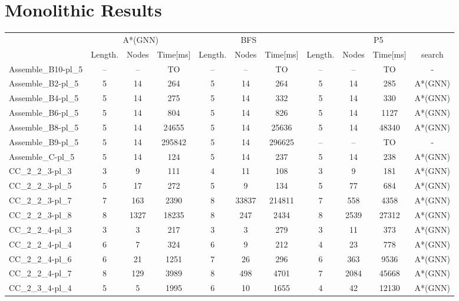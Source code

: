 \documentclass{article}
\newcommand{\BFSres}{BFS}
\newcommand{\GNNres}{A*(GNN)}
\newcommand{\planLength}{Length.}
\newcommand{\nodesExp}{Nodes}
\newcommand{\solvingTime}{Time}
\newcommand{\unsolvedColumn}{--}
\newcommand{\myTO}{TO}
\newcommand{\Pfive}{P5}   %
\begin{document}
\section*{Monolithic Results}
\begin{longtable}[!ht]{l|ccc|ccc|cccc}
\centering
\multirow2{*}{\textbf{Instance Name}} & \multicolumn{3}{c|}{\GNNres} & \multicolumn{3}{c|}{\BFSres} & \multicolumn{4}{c}{\Pfive} \\
\cline{2-11}
& \planLength & \nodesExp & \solvingTime [ms] & \planLength & \nodesExp & \solvingTime [ms] & \planLength & \nodesExp & \solvingTime [ms] & search \\
\hline
Assemble\_B10-pl\_5 & \unsolvedColumn & \unsolvedColumn & \myTO & \unsolvedColumn & \unsolvedColumn & \myTO & \unsolvedColumn & \unsolvedColumn & \myTO & - \\
Assemble\_B2-pl\_5 & 5 & 14 & 264 & 5 & 14 & 264 & 5 & 14 & 285 & A*(GNN) \\
Assemble\_B4-pl\_5 & 5 & 14 & 275 & 5 & 14 & 332 & 5 & 14 & 330 & A*(GNN) \\
Assemble\_B6-pl\_5 & 5 & 14 & 804 & 5 & 14 & 826 & 5 & 14 & 1127 & A*(GNN) \\
Assemble\_B8-pl\_5 & 5 & 14 & 24655 & 5 & 14 & 25636 & 5 & 14 & 48340 & A*(GNN) \\
Assemble\_B9-pl\_5 & 5 & 14 & 295842 & 5 & 14 & 296625 & \unsolvedColumn & \unsolvedColumn & \myTO & - \\
Assemble\_C-pl\_5 & 5 & 14 & 124 & 5 & 14 & 237 & 5 & 14 & 238 & A*(GNN) \\
CC\_2\_2\_3-pl\_3 & 3 & 9 & 111 & 4 & 11 & 108 & 3 & 9 & 181 & A*(GNN) \\
CC\_2\_2\_3-pl\_5 & 5 & 17 & 272 & 5 & 9 & 134 & 5 & 77 & 684 & A*(GNN) \\
CC\_2\_2\_3-pl\_7 & 7 & 163 & 2390 & 8 & 33837 & 214811 & 7 & 558 & 4358 & A*(GNN) \\
CC\_2\_2\_3-pl\_8 & 8 & 1327 & 18235 & 8 & 247 & 2434 & 8 & 2539 & 27312 & A*(GNN) \\
CC\_2\_2\_4-pl\_3 & 3 & 3 & 217 & 3 & 3 & 279 & 3 & 11 & 373 & A*(GNN) \\
CC\_2\_2\_4-pl\_4 & 6 & 7 & 324 & 6 & 9 & 212 & 4 & 23 & 778 & A*(GNN) \\
CC\_2\_2\_4-pl\_6 & 6 & 21 & 1251 & 7 & 26 & 296 & 6 & 363 & 9536 & A*(GNN) \\
CC\_2\_2\_4-pl\_7 & 8 & 129 & 3989 & 8 & 498 & 4701 & 7 & 2084 & 45668 & A*(GNN) \\
CC\_2\_3\_4-pl\_4 & 5 & 5 & 1995 & 6 & 10 & 1655 & 4 & 42 & 12130 & A*(GNN) \\

\end{longtable}
\end{document}
